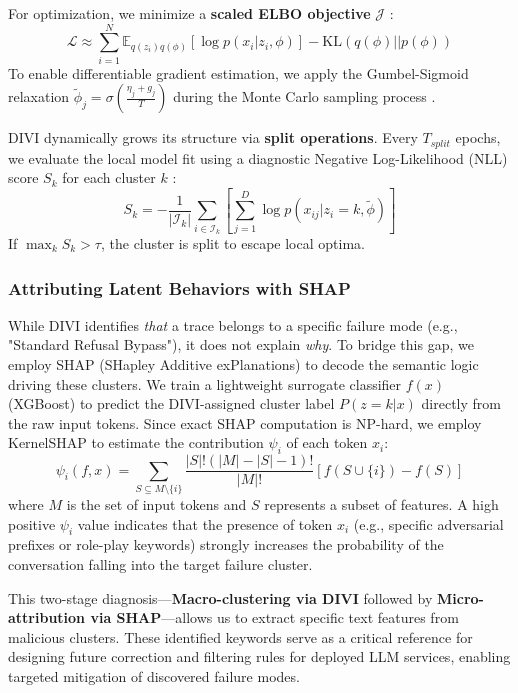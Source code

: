 \documentclass[conference]{IEEEtran}
\begin{document}
For optimization, we minimize a \textbf{scaled ELBO objective} $\mathcal{J}$ \cite{anonymous2025divi}:
\begin{equation}
\mathcal{L} \approx \sum_{i=1}^N \mathbb{E}_{q(z_i)q(\phi)} [\log p(x_i|z_i, \phi)] - \text{KL}(q(\phi)||p(\phi))
\end{equation}
To enable differentiable gradient estimation, we apply the Gumbel-Sigmoid relaxation $\tilde{\phi}_j = \sigma(\frac{\eta_j + g_j}{T})$ during the Monte Carlo sampling process \cite{anonymous2025divi}.

DIVI dynamically grows its structure via \textbf{split operations}. Every $T_{split}$ epochs, we evaluate the local model fit using a diagnostic Negative Log-Likelihood (NLL) score $S_k$ for each cluster $k$ \cite{anonymous2025divi}:
\begin{equation}
S_k = -\frac{1}{|\mathcal{I}_k|}\sum_{i\in\mathcal{I}_k} \left[ \sum_{j=1}^{D} \log p(x_{ij}|z_i=k, \tilde{\phi}) \right]
\end{equation}
If $\max_k S_k > \tau$, the cluster is split to escape local optima.

\subsubsection{Attributing Latent Behaviors with SHAP}
While DIVI identifies \textit{that} a trace belongs to a specific failure mode (e.g., "Standard Refusal Bypass"), it does not explain \textit{why}. To bridge this gap, we employ SHAP (SHapley Additive exPlanations) to decode the semantic logic driving these clusters. We train a lightweight surrogate classifier $f(x)$ (XGBoost) to predict the DIVI-assigned cluster label $P(z=k|x)$ directly from the raw input tokens. 
Since exact SHAP computation is NP-hard, we employ KernelSHAP to estimate the contribution $\psi_i$ of each token $x_i$:
\begin{equation}
\psi_i(f, x) = \sum_{S \subseteq M \setminus \{i\}} \frac{|S|!(|M| - |S| - 1)!}{|M|!} [f(S \cup \{i\}) - f(S)]
\end{equation}
where $M$ is the set of input tokens and $S$ represents a subset of features. 
A high positive $\psi_i$ value indicates that the presence of token $x_i$ (e.g., specific adversarial prefixes or role-play keywords) strongly increases the probability of the conversation falling into the target failure cluster. 

This two-stage diagnosis—\textbf{Macro-clustering via DIVI} followed by \textbf{Micro-attribution via SHAP}—allows us to extract specific text features from malicious clusters. These identified keywords serve as a critical reference for designing future correction and filtering rules for deployed LLM services, enabling targeted mitigation of discovered failure modes.
\end{document}
